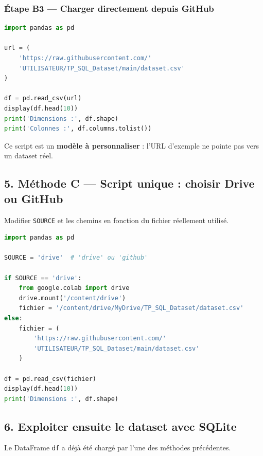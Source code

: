 \documentclass[
]{article}
\newcommand{\passthrough}[1]{#1}
\begin{document}
\subsubsection{Étape B3 --- Charger directement depuis
GitHub}\label{uxe9tape-b3-charger-directement-depuis-github}

\begin{lstlisting}[language=Python]
import pandas as pd

url = (
    'https://raw.githubusercontent.com/'
    'UTILISATEUR/TP_SQL_Dataset/main/dataset.csv'
)

df = pd.read_csv(url)
display(df.head(10))
print('Dimensions :', df.shape)
print('Colonnes :', df.columns.tolist())
\end{lstlisting}

Ce script est un \textbf{modèle à personnaliser} : l'URL d'exemple ne
pointe pas vers un dataset réel.

\subsection{5. Méthode C --- Script unique : choisir Drive ou
GitHub}\label{muxe9thode-c-script-unique-choisir-drive-ou-github}

Modifier \passthrough{\lstinline!SOURCE!} et les chemins en fonction du
fichier réellement utilisé.

\begin{lstlisting}[language=Python]
import pandas as pd

SOURCE = 'drive'  # 'drive' ou 'github'

if SOURCE == 'drive':
    from google.colab import drive
    drive.mount('/content/drive')
    fichier = '/content/drive/MyDrive/TP_SQL_Dataset/dataset.csv'
else:
    fichier = (
        'https://raw.githubusercontent.com/'
        'UTILISATEUR/TP_SQL_Dataset/main/dataset.csv'
    )

df = pd.read_csv(fichier)
display(df.head(10))
print('Dimensions :', df.shape)
\end{lstlisting}

\subsection{6. Exploiter ensuite le dataset avec
SQLite}\label{exploiter-ensuite-le-dataset-avec-sqlite}

Le DataFrame \passthrough{\lstinline!df!} a déjà été chargé par l'une
des méthodes précédentes.
\end{document}
